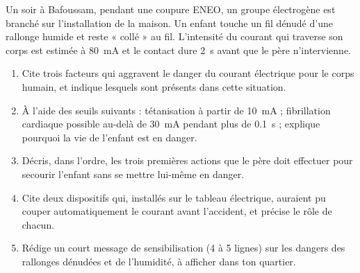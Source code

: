 \documentclass[11pt]{article}
\begin{document}
\begin{exercice}
Un soir à Bafoussam, pendant une coupure ENEO, un groupe électrogène est branché sur l'installation de la maison. Un enfant touche un fil dénudé d'une rallonge humide et reste « collé » au fil. L'intensité du courant qui traverse son corps est estimée à \SI{80}{mA} et le contact dure \SI{2}{s} avant que le père n'intervienne.
\begin{enumerate}
\item Cite trois facteurs qui aggravent le danger du courant électrique pour le corps humain, et indique lesquels sont présents dans cette situation.
\item À l'aide des seuils suivants : tétanisation à partir de \SI{10}{mA} ; fibrillation cardiaque possible au-delà de \SI{30}{mA} pendant plus de \SI{0,1}{s} ; explique pourquoi la vie de l'enfant est en danger.
\item Décris, dans l'ordre, les trois premières actions que le père doit effectuer pour secourir l'enfant sans se mettre lui-même en danger.
\item Cite deux dispositifs qui, installés sur le tableau électrique, auraient pu couper automatiquement le courant avant l'accident, et précise le rôle de chacun.
\item Rédige un court message de sensibilisation (4 à 5 lignes) sur les dangers des rallonges dénudées et de l'humidité, à afficher dans ton quartier.
\end{enumerate}
\end{exercice}
\end{document}
